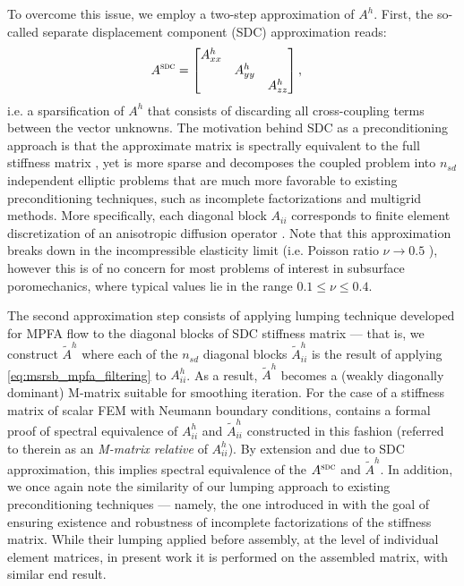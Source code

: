 To overcome this issue, we employ a two-step approximation of $A^h$.   First, the so-called separate displacement component (SDC) \cite{Gustafsson1996} approximation reads:
\begin{align}
	A^{\textsc{sdc}} &=
    \begin{bmatrix}
  	    A_{xx}^h &          &        \\
  	             & A_{yy}^h &        \\
  	             &          & A_{zz}^h 
	\end{bmatrix},
    \label{eq:blk_stiff_SDC}
\end{align}
i.e. a sparsification of $A^h$ that consists of discarding all cross-coupling terms between the vector unknowns.   The motivation behind SDC as a preconditioning approach is that the approximate matrix is spectrally equivalent to the full stiffness matrix \cite{Blaheta1994,Gustaffson1998}, yet is more sparse and decomposes the coupled problem into $n_{sd}$ independent elliptic problems that are much more favorable to existing preconditioning techniques, such as incomplete factorizations and multigrid methods.   More specifically, each diagonal block $A_{ii}$ corresponds to finite element discretization of an anisotropic diffusion operator \cite{Bosma2021}.   Note that this approximation breaks down in the incompressible elasticity limit (i.e. Poisson ratio $\nu \to 0.5$ \cite{Axelsson1978}), however this is of no concern for most problems of interest in subsurface poromechanics, where typical values lie in the range $0.1 \leq \nu \leq 0.4$.

The second approximation step consists of applying lumping technique developed for MPFA flow to the diagonal blocks of SDC stiffness matrix --- that is, we construct $\tilde{A}^h$ where each of the $n_{sd}$ diagonal blocks $\tilde{A}_{ii}^h$ is the result of applying \cref{eq:msrsb_mpfa_filtering} to $A_{ii}^h$.   As a result, $\tilde{A}^h$ becomes a (weakly diagonally dominant) M-matrix suitable for smoothing iteration.   For the case of a stiffness matrix of scalar FEM with Neumann boundary conditions, \cite{Xu2017} contains a formal proof of spectral equivalence of $A_{ii}^h$ and $\tilde{A}_{ii}^h$ constructed in this fashion (referred to therein as an \textit{M-matrix relative} of $A_{ii}^h$).   By extension and due to SDC approximation, this implies spectral equivalence of the $A^{\textsc{sdc}}$ and $\tilde{A}^h$.   In addition, we once again note the similarity of our lumping approach to existing preconditioning techniques --- namely, the one introduced in \cite{Gustafsson1996} with the goal of ensuring existence and robustness of incomplete factorizations of the stiffness matrix.   While their lumping applied before assembly, at the level of individual element matrices, in present work it is performed on the assembled matrix, with similar end result.

